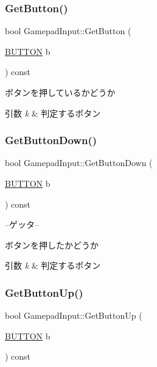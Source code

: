 \subsubsection{\texorpdfstring{Get\+Button()}{GetButton()}}
{\footnotesize\ttfamily bool Gamepad\+Input\+::\+Get\+Button (\begin{DoxyParamCaption}\item[{\mbox{\hyperlink{gamepad__input_8h_a739845b0076428add52ca3cec492e705}{B\+U\+T\+T\+ON}}}]{b }\end{DoxyParamCaption}) const\hspace{0.3cm}{\ttfamily [inline]}}



ボタンを押しているかどうか 


\begin{DoxyParams}{引数}
{\em k} & 判定するボタン \\
\hline
\end{DoxyParams}
\mbox{\label{class_gamepad_input_a209f58f3b488e87d5feb99c7b2f06939}} 
\subsubsection{\texorpdfstring{Get\+Button\+Down()}{GetButtonDown()}}
{\footnotesize\ttfamily bool Gamepad\+Input\+::\+Get\+Button\+Down (\begin{DoxyParamCaption}\item[{\mbox{\hyperlink{gamepad__input_8h_a739845b0076428add52ca3cec492e705}{B\+U\+T\+T\+ON}}}]{b }\end{DoxyParamCaption}) const\hspace{0.3cm}{\ttfamily [inline]}}



--ゲッタ-- 

ボタンを押したかどうか 
\begin{DoxyParams}{引数}
{\em k} & 判定するボタン \\
\hline
\end{DoxyParams}
\mbox{\label{class_gamepad_input_ac33f84af8806aeaff44296de9bf1dde0}} 
\subsubsection{\texorpdfstring{Get\+Button\+Up()}{GetButtonUp()}}
{\footnotesize\ttfamily bool Gamepad\+Input\+::\+Get\+Button\+Up (\begin{DoxyParamCaption}\item[{\mbox{\hyperlink{gamepad__input_8h_a739845b0076428add52ca3cec492e705}{B\+U\+T\+T\+ON}}}]{b }\end{DoxyParamCaption}) const\hspace{0.3cm}{\ttfamily [inline]}}



